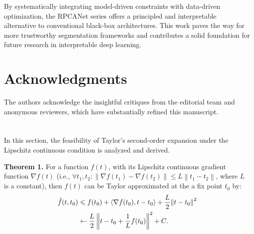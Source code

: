 \documentclass[10pt,journal,compsoc]{IEEEtran}
\begin{document}
By systematically integrating model-driven constraints with data-driven optimization, the RPCANet series offers a principled and interpretable alternative to conventional black-box architectures. This work paves the way for more trustworthy segmentation frameworks and contributes a solid foundation for future research in interpretable deep learning.

\section*{Acknowledgments}
The authors acknowledge the insightful critiques from the editorial team and anonymous reviewers, which have substantially refined this manuscript.


\appendices
\setcounter{table}{0}   
\setcounter{figure}{0}
\setcounter{section}{0}
\setcounter{equation}{0}
\renewcommand{\thefigure}{A.\arabic{figure}}
\renewcommand{\thesection}{A.\arabic{section}}
\renewcommand{\theequation}{A.\arabic{equation}}
\section{}
\label{appendix}
In this section, the feasibility of Taylor's second-order expansion under the Lipschitz continuous condition is analyzed and derived.

\noindent
{\bf{Theorem 1.}} For a function $f(t)$, with its Lipschitz continuous gradient function $\nabla f(t)$ (i.e., $\forall {t_1},{t_2}:\left\| {\nabla f({t_1}) - \nabla f({t_2})} \right\| \leqslant L\left\| {{t_1} - {t_2}} \right\|$, where  $L$ is a constant), then $f(t)$ can be Taylor approximated at the a fix point $t_0$ by:
\begin{equation}
\setlength{\abovedisplayskip}{2pt}
\setlength{\belowdisplayskip}{2pt}
\begin{aligned}
\hat f(t,{t_0}) & \leqslant f({t_0}) + \left \langle {\nabla f({t_0}),t - {t_0}} \right\rangle  + \frac{L}{2}{\left\| {t - {t_0}} \right\|^2}\\
& \leftarrow \frac{L}{2}\left\| {t - {t_0} + \frac{1}{L}f({t_0})} \right\|^2 + C.
\end{aligned}
\end{equation}
\end{document}

